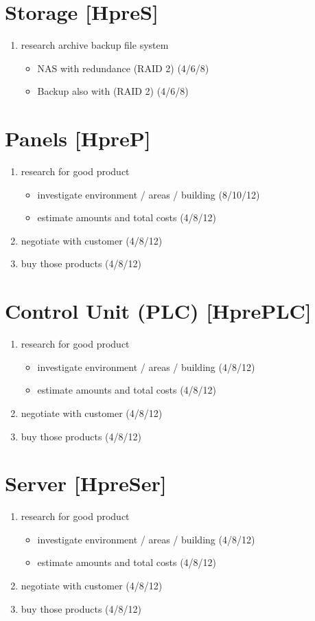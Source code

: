 \documentclass
[
 12pt, %
       DIV12,
       a4paper, %
       oneside, %
       titlepage, %
       parskip=half, %
       headings=normal, %
       listof=totoc, %
       bibliography=totoc, %
       index=totoc, %
       captions=tableheading, %
       ]{scrreprt}
\begin{document}
\section{Storage [HpreS]}
\label{sec:orgeb93f9e}
\begin{enumerate}
\item research archive backup file system
\begin{itemize}
\item NAS with redundance (RAID 2) (4/6/8)
\item Backup also with (RAID 2) (4/6/8)
\end{itemize}
\end{enumerate}

\section{Panels [HpreP]}
\label{sec:org4b41c6c}
\begin{enumerate}
\item research for good product
\begin{itemize}
\item investigate environment / areas / building (8/10/12)
\item estimate amounts and total costs (4/8/12)
\end{itemize}
\item negotiate with customer (4/8/12)
\item buy those products (4/8/12)
\end{enumerate}

\section{Control Unit (PLC) [HprePLC]}
\label{sec:orgd40ef86}
\begin{enumerate}
\item research for good product
\begin{itemize}
\item investigate environment / areas / building (4/8/12)
\item estimate amounts and total costs (4/8/12)
\end{itemize}
\item negotiate with customer (4/8/12)
\item buy those products (4/8/12)
\end{enumerate}

\section{Server [HpreSer]}
\label{sec:org7b31fb6}
\begin{enumerate}
\item research for good product
\begin{itemize}
\item investigate environment / areas / building (4/8/12)
\item estimate amounts and total costs (4/8/12)
\end{itemize}
\item negotiate with customer (4/8/12)
\item buy those products (4/8/12)
\end{enumerate}
\end{document}
